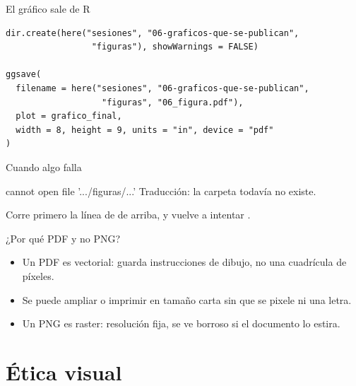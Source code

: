 \begin{frame}[fragile]{El gráfico sale de R}
\begin{lstlisting}
dir.create(here("sesiones", "06-graficos-que-se-publican",
                 "figuras"), showWarnings = FALSE)

ggsave(
  filename = here("sesiones", "06-graficos-que-se-publican",
                   "figuras", "06_figura.pdf"),
  plot = grafico_final,
  width = 8, height = 9, units = "in", device = "pdf"
)
\end{lstlisting}
\end{frame}

\begin{frame}{Cuando algo falla}
  \vspace{0.4em}
  \begin{errorbox}{cannot open file '.../figuras/...'}
    Traducción: la carpeta  todavía no existe.

    \vspace{0.5em}
    Corre primero la línea de  de arriba, y vuelve a
    intentar .
  \end{errorbox}
\end{frame}

\begin{frame}{¿Por qué PDF y no PNG?}
  \vspace{0.3em}
  \begin{itemize}\setlength{\itemsep}{0.9em}
    \item<1-> Un \ac{PDF} es \ac{vectorial}: guarda instrucciones de
          dibujo, no una cuadrícula de píxeles.
    \item<2-> Se puede ampliar o imprimir en tamaño carta sin que se
          pixele ni una letra.
    \item<3-> Un \ac{PNG} es \ac{raster}: resolución fija, se ve borroso
          si el documento lo estira.
  \end{itemize}

  \vspace{1.0em}
\end{frame}

\section{Ética visual}

